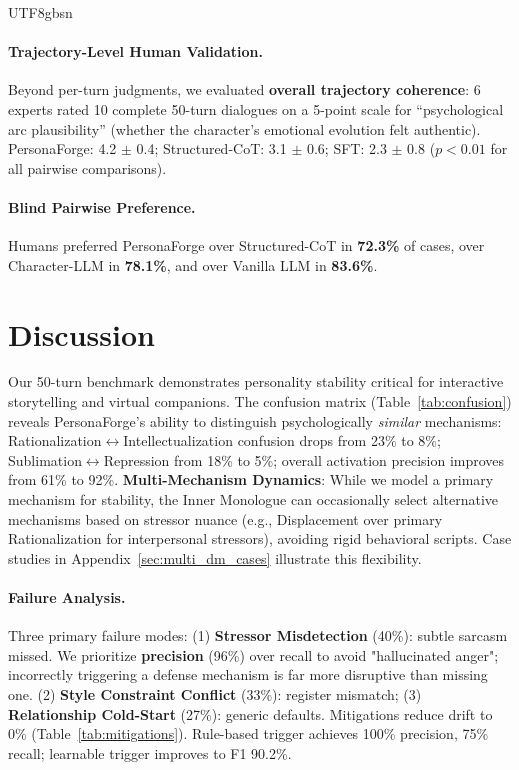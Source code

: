 \documentclass[11pt]{article}
\begin{document}
\begin{CJK*}{UTF8}{gbsn}
\paragraph{Trajectory-Level Human Validation.} Beyond per-turn judgments, we evaluated \textbf{overall trajectory coherence}: 6 experts rated 10 complete 50-turn dialogues on a 5-point scale for ``psychological arc plausibility'' (whether the character's emotional evolution felt authentic). PersonaForge: 4.2 $\pm$ 0.4; Structured-CoT: 3.1 $\pm$ 0.6; SFT: 2.3 $\pm$ 0.8 ($p<0.01$ for all pairwise comparisons).

\paragraph{Blind Pairwise Preference.} Humans preferred PersonaForge over Structured-CoT in \textbf{72.3\%} of cases, over Character-LLM in \textbf{78.1\%}, and over Vanilla LLM in \textbf{83.6\%}.

\section{Discussion}

Our 50-turn benchmark demonstrates personality stability critical for interactive storytelling and virtual companions. The confusion matrix (Table~\ref{tab:confusion}) reveals PersonaForge's ability to distinguish psychologically \textit{similar} mechanisms: Rationalization$\leftrightarrow$Intellectualization confusion drops from 23\% to 8\%; Sublimation$\leftrightarrow$Repression from 18\% to 5\%; overall activation precision improves from 61\% to 92\%. \textbf{Multi-Mechanism Dynamics}: While we model a primary mechanism for stability, the Inner Monologue can occasionally select alternative mechanisms based on stressor nuance (e.g., Displacement over primary Rationalization for interpersonal stressors), avoiding rigid behavioral scripts. Case studies in Appendix~\ref{sec:multi_dm_cases} illustrate this flexibility.

\paragraph{Failure Analysis.} Three primary failure modes: (1) \textbf{Stressor Misdetection} (40\%): subtle sarcasm missed. We prioritize \textbf{precision} (96\%) over recall to avoid "hallucinated anger"; incorrectly triggering a defense mechanism is far more disruptive than missing one. (2) \textbf{Style Constraint Conflict} (33\%): register mismatch; (3) \textbf{Relationship Cold-Start} (27\%): generic defaults. Mitigations reduce drift to 0\% (Table~\ref{tab:mitigations}). Rule-based trigger achieves 100\% precision, 75\% recall; learnable trigger improves to F1 90.2\%.


\end{CJK*}
\end{document}
